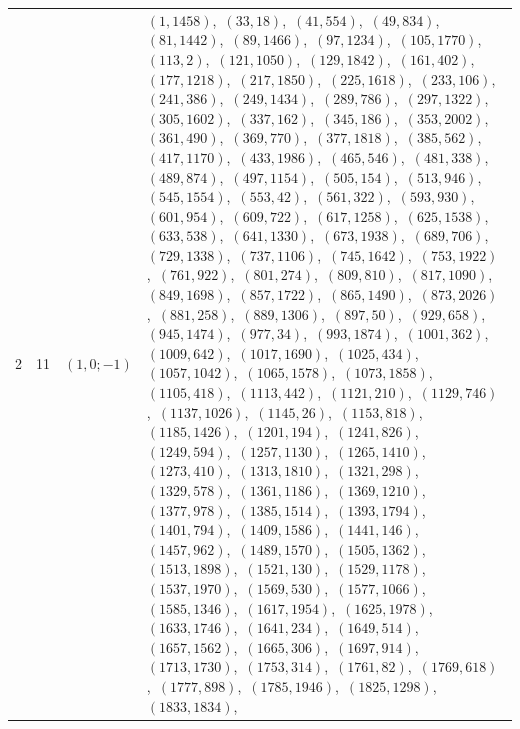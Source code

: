 \documentclass[11pt]{article}
\begin{document}
\begin{longtable}{@{}rrl>{\raggedright\arraybackslash}p{}@{}}
2 & 11 & $(1,0;-1)$ & $(1,1458)$,\allowbreak\ $(33,18)$,\allowbreak\ $(41,554)$,\allowbreak\ $(49,834)$,\allowbreak\ $(81,1442)$,\allowbreak\ $(89,1466)$,\allowbreak\ $(97,1234)$,\allowbreak\ $(105,1770)$,\allowbreak\ $(113,2)$,\allowbreak\ $(121,1050)$,\allowbreak\ $(129,1842)$,\allowbreak\ $(161,402)$,\allowbreak\ $(177,1218)$,\allowbreak\ $(217,1850)$,\allowbreak\ $(225,1618)$,\allowbreak\ $(233,106)$,\allowbreak\ $(241,386)$,\allowbreak\ $(249,1434)$,\allowbreak\ $(289,786)$,\allowbreak\ $(297,1322)$,\allowbreak\ $(305,1602)$,\allowbreak\ $(337,162)$,\allowbreak\ $(345,186)$,\allowbreak\ $(353,2002)$,\allowbreak\ $(361,490)$,\allowbreak\ $(369,770)$,\allowbreak\ $(377,1818)$,\allowbreak\ $(385,562)$,\allowbreak\ $(417,1170)$,\allowbreak\ $(433,1986)$,\allowbreak\ $(465,546)$,\allowbreak\ $(481,338)$,\allowbreak\ $(489,874)$,\allowbreak\ $(497,1154)$,\allowbreak\ $(505,154)$,\allowbreak\ $(513,946)$,\allowbreak\ $(545,1554)$,\allowbreak\ $(553,42)$,\allowbreak\ $(561,322)$,\allowbreak\ $(593,930)$,\allowbreak\ $(601,954)$,\allowbreak\ $(609,722)$,\allowbreak\ $(617,1258)$,\allowbreak\ $(625,1538)$,\allowbreak\ $(633,538)$,\allowbreak\ $(641,1330)$,\allowbreak\ $(673,1938)$,\allowbreak\ $(689,706)$,\allowbreak\ $(729,1338)$,\allowbreak\ $(737,1106)$,\allowbreak\ $(745,1642)$,\allowbreak\ $(753,1922)$,\allowbreak\ $(761,922)$,\allowbreak\ $(801,274)$,\allowbreak\ $(809,810)$,\allowbreak\ $(817,1090)$,\allowbreak\ $(849,1698)$,\allowbreak\ $(857,1722)$,\allowbreak\ $(865,1490)$,\allowbreak\ $(873,2026)$,\allowbreak\ $(881,258)$,\allowbreak\ $(889,1306)$,\allowbreak\ $(897,50)$,\allowbreak\ $(929,658)$,\allowbreak\ $(945,1474)$,\allowbreak\ $(977,34)$,\allowbreak\ $(993,1874)$,\allowbreak\ $(1001,362)$,\allowbreak\ $(1009,642)$,\allowbreak\ $(1017,1690)$,\allowbreak\ $(1025,434)$,\allowbreak\ $(1057,1042)$,\allowbreak\ $(1065,1578)$,\allowbreak\ $(1073,1858)$,\allowbreak\ $(1105,418)$,\allowbreak\ $(1113,442)$,\allowbreak\ $(1121,210)$,\allowbreak\ $(1129,746)$,\allowbreak\ $(1137,1026)$,\allowbreak\ $(1145,26)$,\allowbreak\ $(1153,818)$,\allowbreak\ $(1185,1426)$,\allowbreak\ $(1201,194)$,\allowbreak\ $(1241,826)$,\allowbreak\ $(1249,594)$,\allowbreak\ $(1257,1130)$,\allowbreak\ $(1265,1410)$,\allowbreak\ $(1273,410)$,\allowbreak\ $(1313,1810)$,\allowbreak\ $(1321,298)$,\allowbreak\ $(1329,578)$,\allowbreak\ $(1361,1186)$,\allowbreak\ $(1369,1210)$,\allowbreak\ $(1377,978)$,\allowbreak\ $(1385,1514)$,\allowbreak\ $(1393,1794)$,\allowbreak\ $(1401,794)$,\allowbreak\ $(1409,1586)$,\allowbreak\ $(1441,146)$,\allowbreak\ $(1457,962)$,\allowbreak\ $(1489,1570)$,\allowbreak\ $(1505,1362)$,\allowbreak\ $(1513,1898)$,\allowbreak\ $(1521,130)$,\allowbreak\ $(1529,1178)$,\allowbreak\ $(1537,1970)$,\allowbreak\ $(1569,530)$,\allowbreak\ $(1577,1066)$,\allowbreak\ $(1585,1346)$,\allowbreak\ $(1617,1954)$,\allowbreak\ $(1625,1978)$,\allowbreak\ $(1633,1746)$,\allowbreak\ $(1641,234)$,\allowbreak\ $(1649,514)$,\allowbreak\ $(1657,1562)$,\allowbreak\ $(1665,306)$,\allowbreak\ $(1697,914)$,\allowbreak\ $(1713,1730)$,\allowbreak\ $(1753,314)$,\allowbreak\ $(1761,82)$,\allowbreak\ $(1769,618)$,\allowbreak\ $(1777,898)$,\allowbreak\ $(1785,1946)$,\allowbreak\ $(1825,1298)$,\allowbreak\ $(1833,1834)$,\allowbreak\ 
\end{longtable}
\end{document}
